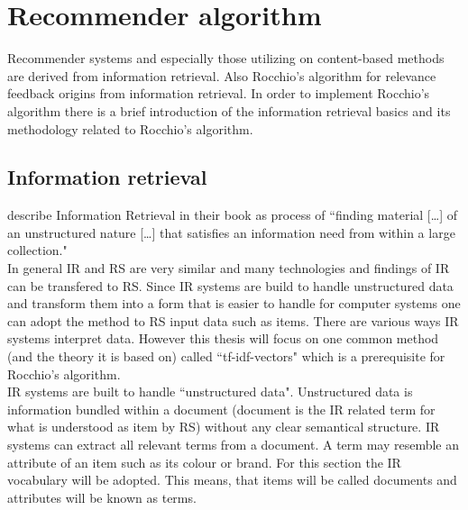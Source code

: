 
\section{Recommender algorithm}
Recommender systems and especially those utilizing on content-based methods are derived from information retrieval.\citep[p.~92-99]{lops:2011}
Also Rocchio's algorithm for relevance feedback origins from information retrieval.\citep[p.~178]{manning:2009}
In order to implement Rocchio's algorithm there is a brief introduction of the information retrieval basics and its methodology related to Rocchio's algorithm.

\subsection{Information retrieval}
\citeauthor{manning:2009} describe Information Retrieval in their book as process of ``finding material [\dots] of an unstructured nature [\dots] that satisfies an information need from within a large collection."\citep[p.~1]{manning:2009}\\
In general IR and RS are very similar and many technologies and findings of IR can be transfered to RS.
Since IR systems are build to handle unstructured data and transform them into a form that is easier to handle for computer systems one can adopt the method to RS input data such as items.\citep[p.~21-23]{ricci:2011}
There are various ways IR systems interpret data.
However this thesis will focus on one common method (and the theory it is based on) called ``tf-idf-vectors" which is a prerequisite for Rocchio's algorithm.\citep[p.~93]{lops:2011}
\\
IR systems are built to handle ``unstructured data".
Unstructured data is information bundled within a document (document is the IR related term for what is understood as item by RS) without any clear semantical structure.\citep[p.~1-3]{manning:2009}
IR systems can extract all relevant terms from a document.
A term may resemble an attribute of an item such as its colour or brand.
For this section the IR vocabulary will be adopted.
This means, that items will be called documents and attributes will be known as terms.

